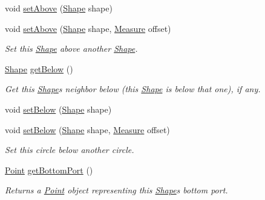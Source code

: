 \begin{DoxyCompactItemize}
void \hyperlink{classcom_1_1aarrelaakso_1_1drawl_1_1_shape_a942b3cf3365498dc1ac6b0309ce33b86}{set\+Above} (\hyperlink{classcom_1_1aarrelaakso_1_1drawl_1_1_shape}{Shape} shape)
\item 
void \hyperlink{classcom_1_1aarrelaakso_1_1drawl_1_1_shape_aab165a65f7bd1e55a6de7166577725a3}{set\+Above} (\hyperlink{classcom_1_1aarrelaakso_1_1drawl_1_1_shape}{Shape} shape, \hyperlink{classcom_1_1aarrelaakso_1_1drawl_1_1_measure}{Measure} offset)
\begin{DoxyCompactList}\small\item\em Set this \hyperlink{classcom_1_1aarrelaakso_1_1drawl_1_1_shape}{Shape} above another \hyperlink{classcom_1_1aarrelaakso_1_1drawl_1_1_shape}{Shape}. \end{DoxyCompactList}\item 
\hyperlink{classcom_1_1aarrelaakso_1_1drawl_1_1_shape}{Shape} \hyperlink{classcom_1_1aarrelaakso_1_1drawl_1_1_shape_a53de5ab609d879719cd3b372dfe8df58}{get\+Below} ()
\begin{DoxyCompactList}\small\item\em Get this \hyperlink{classcom_1_1aarrelaakso_1_1drawl_1_1_shape}{Shape}\textquotesingle{}s neighbor below (this \hyperlink{classcom_1_1aarrelaakso_1_1drawl_1_1_shape}{Shape} is below that one), if any. \end{DoxyCompactList}\item 
void \hyperlink{classcom_1_1aarrelaakso_1_1drawl_1_1_shape_aa0ec0030515b5096820e4dd030c0b320}{set\+Below} (\hyperlink{classcom_1_1aarrelaakso_1_1drawl_1_1_shape}{Shape} shape)
\item 
void \hyperlink{classcom_1_1aarrelaakso_1_1drawl_1_1_shape_aa0dd6332c22877c42b8c3863e5cc579e}{set\+Below} (\hyperlink{classcom_1_1aarrelaakso_1_1drawl_1_1_shape}{Shape} shape, \hyperlink{classcom_1_1aarrelaakso_1_1drawl_1_1_measure}{Measure} offset)
\begin{DoxyCompactList}\small\item\em Set this circle below another circle. \end{DoxyCompactList}\item 
\hyperlink{classcom_1_1aarrelaakso_1_1drawl_1_1_point}{Point} \hyperlink{classcom_1_1aarrelaakso_1_1drawl_1_1_shape_aba14efe9a16c0808580963c66b171082}{get\+Bottom\+Port} ()
\begin{DoxyCompactList}\small\item\em Returns a \hyperlink{classcom_1_1aarrelaakso_1_1drawl_1_1_point}{Point} object representing this \hyperlink{classcom_1_1aarrelaakso_1_1drawl_1_1_shape}{Shape}\textquotesingle{}s bottom port. \end{DoxyCompactList}\item 

\end{DoxyCompactItemize}
